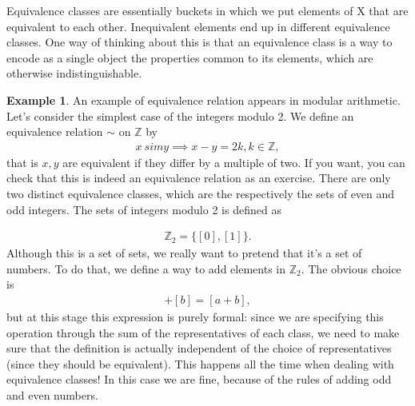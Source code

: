\documentclass{book}
\theoremstyle{definition}
\newtheorem{exmp}{Example}[section]
\begin{document}
Equivalence classes are essentially buckets in which we put elements of X that are equivalent
to each other. Inequivalent elements end up in different equivalence classes. One way of
thinking about this is that an equivalence class is a way to encode as a single object the
properties common to its elements, which are otherwise indistinguishable.


\begin{exmp}
	An example of equivalence relation appears in modular arithmetic. Let's consider the simplest case of the integers modulo 2. We define an equivalence relation $\sim$ on $\mathbb{Z}$ by
	\begin{align}
	x\ sim y \implies x-y = 2k, k\in \mathbb{Z},
	\end{align}
	that is $x,y$ are equivalent if they differ by a multiple of two. If you want, you can check that this is indeed an equivalence relation as an exercise. There are only two distinct equivalence classes, which are the respectively the sets of even and odd integers. The sets of integers modulo 2 is
	defined as

	\begin{align}
	\mathbb{Z}_2 = \{ [0], [1]  \}.
	\end{align}
	Although this is a set of sets, we really want to pretend that it's a set of numbers. To do
	that, we define a way to add elements in $\mathbb{Z}_2$. The obvious choice is
	\begin{align}
	[a] + [b] = [a+b],
	\end{align}
	but at this stage this expression is purely formal: since we are specifying this operation
	through the sum of the representatives of each class, we need to make sure that the definition
	is actually independent of the choice of representatives (since they should be equivalent).
	This happens all the time when dealing with equivalence classes! In this case we are fine, because of the rules of adding odd and even numbers. 
\end{exmp}
\end{document}
